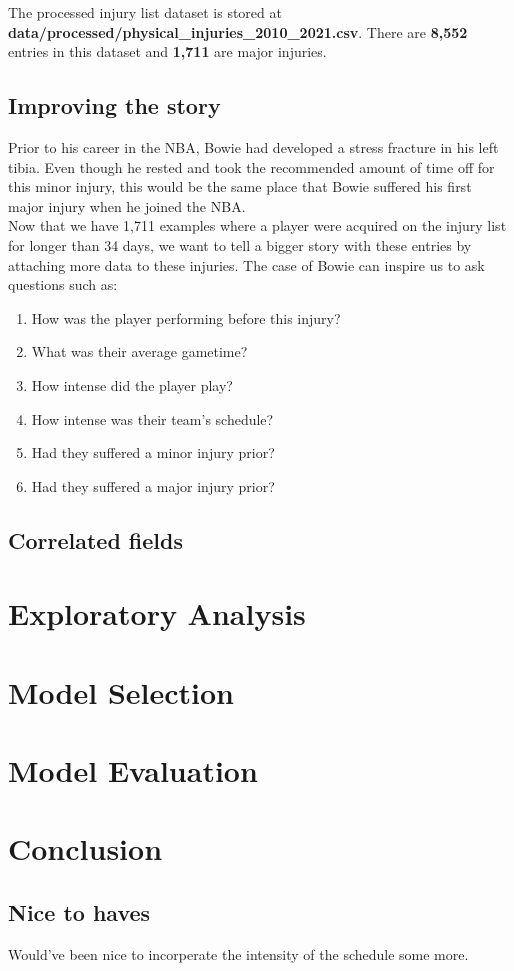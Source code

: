 \documentclass{article}
\begin{document}
The processed injury list dataset is stored at \textbf{data/processed/physical\_injuries\_2010\_2021.csv}.
There are \textbf{8,552} entries in this dataset and \textbf{1,711} are major injuries.

\subsection*{Improving the story}

Prior to his career in the NBA, Bowie had developed a stress fracture in his left tibia.
Even though he rested and took the recommended amount of time off for this minor injury,
this would be the same place that Bowie suffered his first major injury when he joined the NBA.\\

Now that we have 1,711 examples where a player were acquired on the injury list
for longer than 34 days, we want to tell a bigger story with these entries by attaching
more data to these injuries. The case of Bowie can inspire us to ask questions such as:

\begin{enumerate}
    \item How was the player performing before this injury?
    \item What was their average gametime?
    \item How intense did the player play?
    \item How intense was their team's schedule?
    \item Had they suffered a minor injury prior?
    \item Had they suffered a major injury prior?
\end{enumerate} 




\subsection*{Correlated fields}



\newpage
\section*{Exploratory Analysis}



\section*{Model Selection}

\section*{Model Evaluation}

\section*{Conclusion}

\subsection*{Nice to haves}

Would've been nice to incorperate the intensity of the schedule some more.
\end{document}
